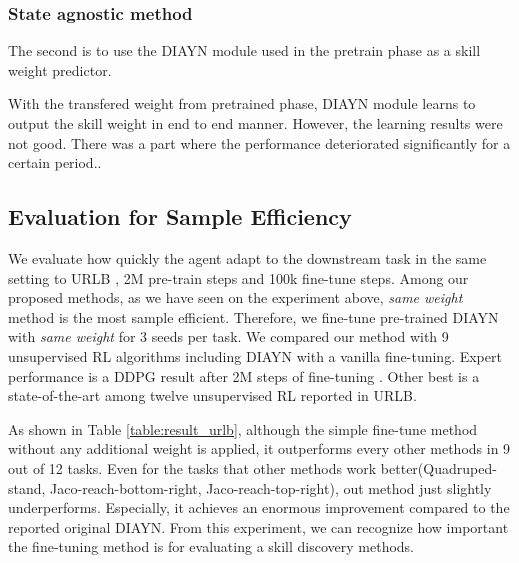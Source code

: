 \subsubsection{State agnostic method}
The second is to use the DIAYN module used in the pretrain phase as a skill weight predictor.

With the transfered weight from pretrained phase, DIAYN module learns to output the skill weight in end to end manner.
However, the learning results were not good.
There was a part where the performance deteriorated significantly for a certain period..


\subsection{Evaluation for Sample Efficiency}
We evaluate how quickly the agent adapt to the downstream task in the same setting to URLB \cite{laskin2021urlb}, 2M pre-train steps and 100k fine-tune steps.
Among our proposed methods, as we have seen on the experiment above, \emph{same weight} method is the most sample efficient.
Therefore, we fine-tune pre-trained DIAYN with \emph{same weight}  for 3 seeds per task.
We compared our method with 9 unsupervised RL algorithms including DIAYN with a vanilla fine-tuning.
Expert performance is a DDPG result after 2M steps of fine-tuning \cite{laskin2022cic}.
Other best is a state-of-the-art among twelve unsupervised RL reported in URLB.

As shown in Table \ref{table:result_urlb}, although the simple fine-tune method without any additional weight is applied,
it outperforms every other methods in 9 out of 12 tasks.
Even for the tasks that other methods work better(Quadruped-stand, Jaco-reach-bottom-right, Jaco-reach-top-right),
out method just slightly underperforms.
Especially, it achieves an enormous improvement compared to the reported original DIAYN.
From this experiment, we can recognize how important the fine-tuning method is for
evaluating a skill discovery methods.

